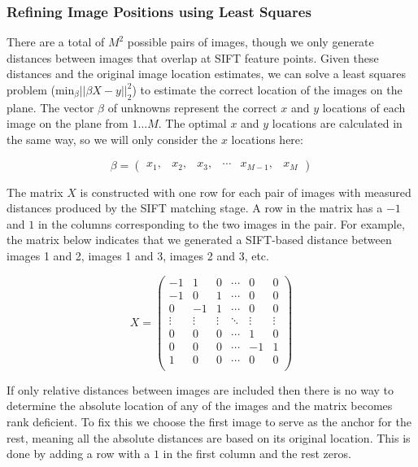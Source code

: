 \documentclass[10pt,twocolumn,letterpaper]{article}
\begin{document}
\subsubsection{Refining Image Positions using Least Squares}

There are a total of $M^{2}$ possible pairs of images, though we only generate distances between images that overlap at SIFT feature
points. Given these distances and the original image location
estimates, we can solve a least squares problem ($\textrm{min}_{\beta}
||\beta X - y||_2^2 $) to estimate the correct location of the images
on the plane. The vector $\beta$ of unknowns represent the correct $x$ and
$y$ locations of each image on the plane from $1 \dots M$. The optimal $x$ and $y$ locations are calculated in the same way, so we
will only consider the $x$ locations here:


\[\beta =
\begin{pmatrix}
  x_1, & x_2, & x_3, & \cdots & x_{M-1}, & x_M
\end{pmatrix}
\]

The matrix $X$ is constructed with one row for each pair of images
with measured distances produced by the SIFT matching stage. A row in
the matrix has a $-1$ and $1$ in the columns corresponding to the two
images in the pair. For example, the matrix below indicates that we
generated a SIFT-based distance between images 1 and 2, images 1 and
3, images 2 and 3, etc.

\[
X =
\begin{pmatrix}
  -1 & 1 & 0 & \cdots & 0 & 0\\
  -1 & 0 & 1 & \cdots & 0 & 0\\
  0 & -1 & 1 & \cdots & 0 & 0\\
  \vdots  & \vdots & \vdots & \ddots & \vdots  & \vdots\\
  0 & 0 & 0 & \cdots & 1 & 0 \\
  0 & 0 & 0 & \cdots & -1 & 1 \\
  1 & 0 & 0 & \cdots & 0 & 0 \\
\end{pmatrix}
\]

If only relative distances between images are included then there is
no way to determine the absolute location of any of the images and the
matrix becomes rank deficient. To fix this we choose the first image
to serve as the anchor for the rest, meaning all the absolute
distances are based on its original location. This is done by adding a
row with a $1$ in the first column and the rest zeros.
\end{document}
